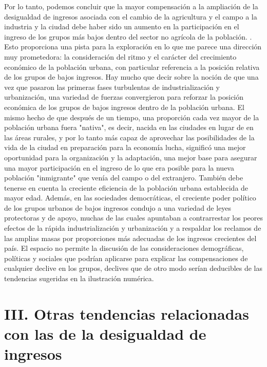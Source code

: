Por lo tanto, podemos concluir que la mayor compensación a la ampliación de la desigualdad de ingresos asociada con el cambio de la agricultura y el campo a la industria y la ciudad debe haber sido un aumento en la participación en el ingreso de los grupos más bajos dentro del sector no agrícola de la población. . Esto proporciona una pista para la exploración en lo que me parece una dirección muy prometedora: la consideración del ritmo y el carácter del crecimiento económico de la población urbana, con particular referencia a la posición relativa de los grupos de bajos ingresos. Hay mucho que decir sobre la noción de que una vez que pasaron las primeras fases turbulentas de industrialización y urbanización, una variedad de fuerzas convergieron para reforzar la posición económica de los grupos de bajos ingresos dentro de la población urbana. El mismo hecho de que después de un tiempo, una proporción cada vez mayor de la población urbana fuera "nativa", es decir, nacida en las ciudades en lugar de en las áreas rurales, y por lo tanto más capaz de aprovechar las posibilidades de la vida de la ciudad en preparación para la economía lucha, significó una mejor oportunidad para la organización y la adaptación, una mejor base para asegurar una mayor participación en el ingreso de lo que era posible para la nueva población "inmigrante" que venía del campo o del extranjero. También debe tenerse en cuenta la creciente eficiencia de la población urbana establecida de mayor edad. Además, en las sociedades democráticas, el creciente poder político de los grupos urbanos de bajos ingresos condujo a una variedad de leyes protectoras y de apoyo, muchas de las cuales apuntaban a contrarrestar los peores efectos de la rápida industrialización y urbanización y a respaldar los reclamos de las amplias masas por proporciones más adecuadas de los ingresos crecientes del país. El espacio no permite la discusión de las consideraciones demográficas, políticas y sociales que podrían aplicarse para explicar las compensaciones de cualquier declive en los grupos, declives que de otro modo serían deducibles de las tendencias sugeridas en la ilustración numérica.


\section*{\centering III. Otras tendencias relacionadas con las de la desigualdad de ingresos}




